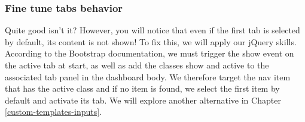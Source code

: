 \documentclass[]{book}
\newenvironment{Shaded}{\begin{snugshade}}{\end{snugshade}}
\newcommand{\AttributeTok}[1]{\textcolor[rgb]{0.77,0.63,0.00}{#1}}
\newcommand{\CommentTok}[1]{\textcolor[rgb]{0.56,0.35,0.01}{\textit{#1}}}
\newcommand{\ControlFlowTok}[1]{\textcolor[rgb]{0.13,0.29,0.53}{\textbf{#1}}}
\newcommand{\DecValTok}[1]{\textcolor[rgb]{0.00,0.00,0.81}{#1}}
\newcommand{\KeywordTok}[1]{\textcolor[rgb]{0.13,0.29,0.53}{\textbf{#1}}}
\newcommand{\NormalTok}[1]{#1}
\newcommand{\OperatorTok}[1]{\textcolor[rgb]{0.81,0.36,0.00}{\textbf{#1}}}
\newcommand{\SpecialCharTok}[1]{\textcolor[rgb]{0.00,0.00,0.00}{#1}}
\newcommand{\StringTok}[1]{\textcolor[rgb]{0.31,0.60,0.02}{#1}}
\newcommand{\VariableTok}[1]{\textcolor[rgb]{0.00,0.00,0.00}{#1}}
\newcommand{\VerbatimStringTok}[1]{\textcolor[rgb]{0.31,0.60,0.02}{#1}}
\begin{document}
\hypertarget{fine-tune-tabs-behavior}{%
\subsubsection{Fine tune tabs behavior}\label{fine-tune-tabs-behavior}}

Quite good isn't it? However, you will notice that even if the first tab is selected by default, its content is not shown! To fix this, we will apply our jQuery skills. According to the Bootstrap documentation, we must trigger the show event on the active tab at start, as well as add the classes show and active to the associated tab panel in the dashboard body. We therefore target the nav item that has the active class and if no item is found, we select the first item by default and activate its tab. We will explore another alternative in Chapter \ref{custom-templates-inputs}.

\begin{Shaded}
\end{Shaded}
\end{document}
